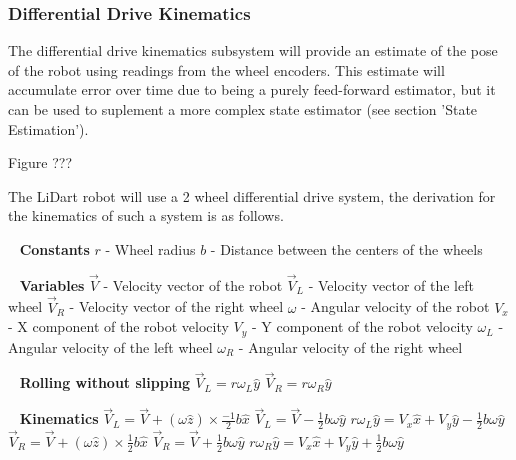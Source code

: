 \documentclass[12pt]{article}
\begin{document}
\subsubsection{Differential Drive Kinematics}
The differential drive kinematics subsystem will provide an estimate of the pose of the robot using readings from
the wheel encoders. This estimate will accumulate error over time due to being a purely feed-forward estimator, but
it can be used to suplement a more complex state estimator (see section 'State Estimation').

Figure ???

The LiDart robot will use a 2 wheel differential drive system, the derivation for the kinematics of such a system is as follows.

\ \newline
\textbf{Constants}
\newline $r$ - Wheel radius
\newline $b$ - Distance between the centers of the wheels

\ \newline
\textbf{Variables}
\newline $\vec{V}$ - Velocity vector of the robot
\newline $\vec{V}_L$ - Velocity vector of the left wheel
\newline $\vec{V}_R$ - Velocity vector of the right wheel
\newline $\omega$ - Angular velocity of the robot 
\newline $V_x$ - X component of the robot velocity
\newline $V_y$ - Y component of the robot velocity
\newline $\omega_L$ - Angular velocity of the left wheel 
\newline $\omega_R$ - Angular velocity of the right wheel

\ \newline
\textbf{Rolling without slipping}
\newline $\vec{V}_L = r\omega_L\hat{y}$
\newline $\vec{V}_R = r\omega_R\hat{y}$

\ \newline
\textbf{Kinematics}
\newline $\vec{V}_L = \vec{V} + (\omega\hat{z}) \times \frac{-1}{2}b\hat{x}$
\newline $\vec{V}_L = \vec{V} - \frac{1}{2}b\omega\hat{y}$
\newline $r\omega_L\hat{y} = V_x\hat{x} + V_y\hat{y} - \frac{1}{2}b\omega\hat{y}$
\newline $\vec{V}_R = \vec{V} + (\omega\hat{z}) \times \frac{1}{2}b\hat{x}$
\newline $\vec{V}_R = \vec{V} + \frac{1}{2}b\omega\hat{y}$
\newline $r\omega_R\hat{y} = V_x\hat{x} + V_y\hat{y} + \frac{1}{2}b\omega\hat{y}$
\end{document}
